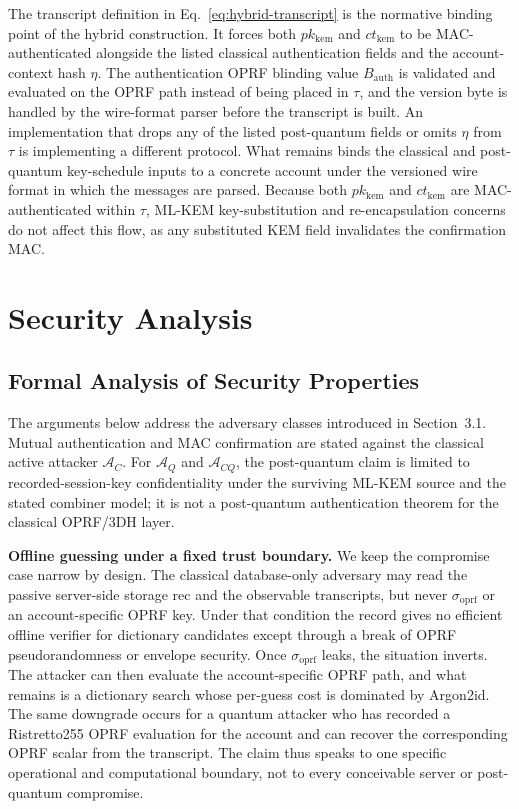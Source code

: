 \documentclass{ieeeijc}
\newcommand{\sigoprf}{\sigma_{\mathrm{oprf}}}
\theoremstyle{remark}
\begin{document}
The transcript definition in Eq.~\eqref{eq:hybrid-transcript} is the normative binding point of the hybrid construction. It forces both $pk_{\mathrm{kem}}$ and $ct_{\mathrm{kem}}$ to be MAC-authenticated alongside the listed classical authentication fields and the account-context hash $\eta$. The authentication OPRF blinding value $B_{\mathrm{auth}}$ is validated and evaluated on the OPRF path instead of being placed in $\tau$, and the version byte is handled by the wire-format parser before the transcript is built. An implementation that drops any of the listed post-quantum fields or omits $\eta$ from $\tau$ is implementing a different protocol. What remains binds the classical and post-quantum key-schedule inputs to a concrete account under the versioned wire format in which the messages are parsed. Because both $pk_{\mathrm{kem}}$ and $ct_{\mathrm{kem}}$ are MAC-authenticated within $\tau$, ML-KEM key-substitution and re-encapsulation concerns do not affect this flow, as any substituted KEM field invalidates the confirmation MAC.

\section{Security Analysis}

\subsection{Formal Analysis of Security Properties}

The arguments below address the adversary classes introduced in
Section~3.1. Mutual authentication and MAC confirmation are stated against
the classical active attacker $\mathcal{A}_C$. For $\mathcal{A}_Q$ and
$\mathcal{A}_{CQ}$, the post-quantum claim is limited to recorded-session-key
confidentiality under the surviving ML-KEM source and the stated combiner
model; it is not a post-quantum authentication theorem for the classical
OPRF/3DH layer.

\medskip
\noindent\textbf{Offline guessing under a fixed trust boundary.}
We keep the compromise case narrow by design. The classical database-only
adversary may read the passive server-side storage $\mathrm{rec}$ and the
observable transcripts, but never $\sigoprf$ or an account-specific OPRF
key. Under that condition the record gives no efficient offline verifier
for dictionary candidates except through a break of OPRF pseudorandomness or
envelope security. Once $\sigoprf$ leaks, the situation inverts. The
attacker can then evaluate the account-specific OPRF path, and what remains
is a dictionary search whose per-guess cost is dominated by Argon2id. The
same downgrade occurs for a quantum attacker who has recorded a Ristretto255
OPRF evaluation for the account and can recover the corresponding OPRF
scalar from the transcript. The claim thus speaks to one specific
operational and computational boundary, not to every conceivable server or
post-quantum compromise.
\end{document}
